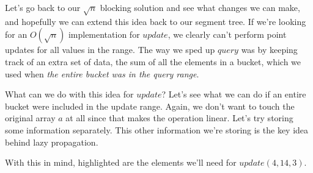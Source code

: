 Let's go back to our $\sqrt{n}$ blocking solution and see what changes we can make, and hopefully we can extend this idea back to our segment tree. If we're looking for an $O(\sqrt{n})$ implementation for $update$, we clearly can't perform point updates for all values in the range. The way we sped up $query$ was by keeping track of an extra set of data, the sum of all the elements in a bucket, which we used when \textit{the entire bucket was in the query range}.

\begin{center}
{
}
\end{center}

What can we do with this idea for $update$? Let's see what we can do if an entire bucket were included in the update range. Again, we don't want to touch the original array $a$ at all since that makes the operation linear. Let's try storing some information separately. This other information we're storing is the key idea behind lazy propagation.

With this in mind, highlighted are the elements we'll need for $update(4,14,3)$.

